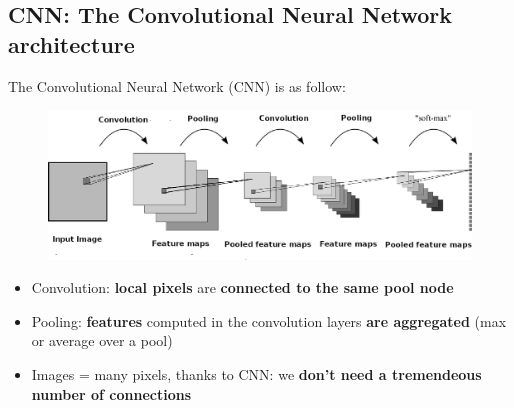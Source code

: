 \documentclass{beamer}[10pt, usepdftitle=false, handout]
\begin{document}
   
	\subsection{CNN: The Convolutional Neural Network architecture}    
    \begin{frame}
	
	The Convolutional Neural Network (CNN) is as follow:
	\vspace*{1em}
	\begin{figure}
		\includegraphics[scale=0.6]{30.png} 
	\end{figure}
	\vspace*{1em}
	
	\begin{itemize}
	\item{Convolution: \textbf{local pixels} are \textbf{connected to the same pool node}}
	\item{Pooling: \textbf{features} computed in the convolution layers \textbf{are aggregated} (max or average over a pool)}
	\item{Images = many pixels, thanks to CNN: we \textbf{don't need a tremendeous number of connections}}
	\end{itemize}

    \end{frame}   
    
\end{document}
